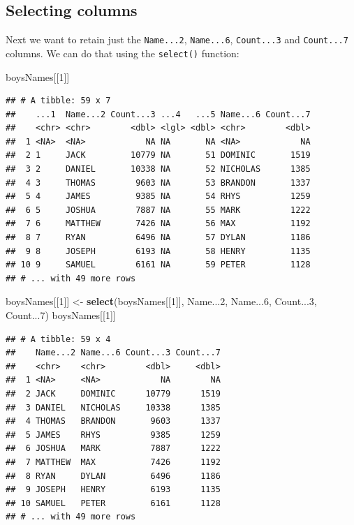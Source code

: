 \documentclass[]{book}
\newenvironment{Shaded}{\begin{snugshade}}{\end{snugshade}}
\newcommand{\DecValTok}[1]{\textcolor[rgb]{0.00,0.00,0.81}{#1}}
\newcommand{\KeywordTok}[1]{\textcolor[rgb]{0.13,0.29,0.53}{\textbf{#1}}}
\newcommand{\NormalTok}[1]{#1}
\newcommand{\StringTok}[1]{\textcolor[rgb]{0.31,0.60,0.02}{#1}}
\begin{document}
\hypertarget{selecting-columns}{%
\subsection{Selecting columns}\label{selecting-columns}}

Next we want to retain just the \texttt{Name...2}, \texttt{Name...6}, \texttt{Count...3} and \texttt{Count...7} columns.
We can do that using the \texttt{select()} function:

\begin{Shaded}
\begin{Highlighting}[]
\NormalTok{boysNames[[}\DecValTok{1}\NormalTok{]]}
\end{Highlighting}
\end{Shaded}

\begin{verbatim}
## # A tibble: 59 x 7
##    ...1  Name...2 Count...3 ...4   ...5 Name...6 Count...7
##    <chr> <chr>        <dbl> <lgl> <dbl> <chr>        <dbl>
##  1 <NA>  <NA>            NA NA       NA <NA>            NA
##  2 1     JACK         10779 NA       51 DOMINIC       1519
##  3 2     DANIEL       10338 NA       52 NICHOLAS      1385
##  4 3     THOMAS        9603 NA       53 BRANDON       1337
##  5 4     JAMES         9385 NA       54 RHYS          1259
##  6 5     JOSHUA        7887 NA       55 MARK          1222
##  7 6     MATTHEW       7426 NA       56 MAX           1192
##  8 7     RYAN          6496 NA       57 DYLAN         1186
##  9 8     JOSEPH        6193 NA       58 HENRY         1135
## 10 9     SAMUEL        6161 NA       59 PETER         1128
## # ... with 49 more rows
\end{verbatim}

\begin{Shaded}
\begin{Highlighting}[]
\NormalTok{boysNames[[}\DecValTok{1}\NormalTok{]] <-}\StringTok{ }\KeywordTok{select}\NormalTok{(boysNames[[}\DecValTok{1}\NormalTok{]], Name...}\DecValTok{2}\NormalTok{, Name...}\DecValTok{6}\NormalTok{, Count...}\DecValTok{3}\NormalTok{, Count...}\DecValTok{7}\NormalTok{)}
\NormalTok{boysNames[[}\DecValTok{1}\NormalTok{]]}
\end{Highlighting}
\end{Shaded}

\begin{verbatim}
## # A tibble: 59 x 4
##    Name...2 Name...6 Count...3 Count...7
##    <chr>    <chr>        <dbl>     <dbl>
##  1 <NA>     <NA>            NA        NA
##  2 JACK     DOMINIC      10779      1519
##  3 DANIEL   NICHOLAS     10338      1385
##  4 THOMAS   BRANDON       9603      1337
##  5 JAMES    RHYS          9385      1259
##  6 JOSHUA   MARK          7887      1222
##  7 MATTHEW  MAX           7426      1192
##  8 RYAN     DYLAN         6496      1186
##  9 JOSEPH   HENRY         6193      1135
## 10 SAMUEL   PETER         6161      1128
## # ... with 49 more rows
\end{verbatim}
\end{document}
